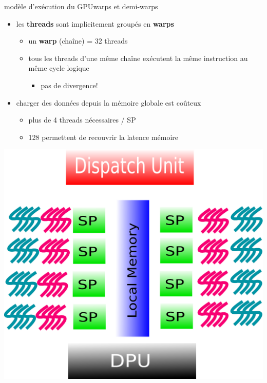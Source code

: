 \documentclass[11pt,mathserif]{beamer}
\newcommand{\kontuz}{\faExclamationTriangle}
\begin{document}
\begin{frame}{modèle d'exécution du GPU}{warps et demi-warps}
\begin{minipage}[c]{0.59\linewidth}
\begin{itemize}
  \item les {\bf threads} sont implicitement groupés en {\bf warps}
    \begin{itemize}
      \item un {\bf warp} (chaîne) = 32 threads 
      \item tous les threads d'une même chaîne exécutent la même instruction au même cycle logique
        \begin{itemize}
          \item[\kontuz] \alert{pas de divergence!}
        \end{itemize}
    \end{itemize}
  \item charger des données depuis la mémoire globale est coûteux
    \begin{itemize}
      \item plus de 4 threads nécessaires / SP
      \item 128 permettent de recouvrir la latence mémoire
    \end{itemize}
\end{itemize}
\end{minipage}
\begin{minipage}[c]{0.39\linewidth}
\begin{center}
  \includegraphics[width=0.95\linewidth]{fig/GPUArchi8ThreadDiv.eps}
\end{center}
\end{minipage}
\end{frame}
\end{document}
